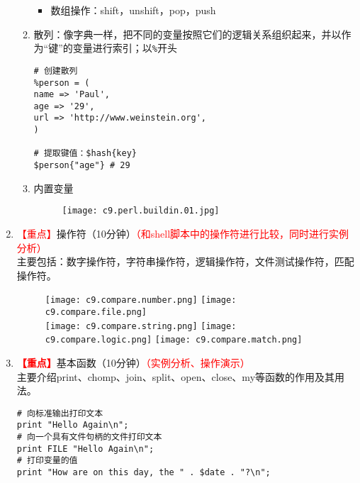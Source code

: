 \documentclass{TIJMUjiaoanLL}
\begin{document}
\begin{enumerate}
\begin{enumerate}
\begin{itemize}
	  \item 数组操作：shift，unshift，pop，push
	\end{itemize}


\otherTail
\newpage
\otherHeader


      \item 散列：像字典一样，把不同的变量按照它们的逻辑关系组织起来，并以作为“键”的变量进行索引；以\verb|%|开头
\begin{verbatim}
# 创建散列
%person = (
name => 'Paul',
age => '29',
url => 'http://www.weinstein.org',
)

# 提取键值：$hash{key}
$person{"age"} # 29
\end{verbatim}
      \item 内置变量
    \vspace*{-10pt}
    \begin{figure}[h]
      \centering
      \texttt{[image: c9.perl.buildin.01.jpg]}
    \end{figure}
    \vspace*{-10pt}

    \end{enumerate}

  \item \textcolor{red}{【重点】}操作符（10分钟）\textcolor{red}{（和shell脚本中的操作符进行比较，同时进行实例分析）}
    \\ 主要包括：数字操作符，字符串操作符，逻辑操作符，文件测试操作符，匹配操作符。
    \vspace*{-10pt}
    \begin{figure}[h]
      \centering
      \texttt{[image: c9.compare.number.png]}
      \quad
      \texttt{[image: c9.compare.file.png]}\\
      \texttt{[image: c9.compare.string.png]}
      \quad
      \texttt{[image: c9.compare.logic.png]}
      \quad
      \texttt{[image: c9.compare.match.png]}
    \end{figure}
    \vspace*{-10pt}


\otherTail
\newpage
\otherHeader


\item \textcolor{red}{\textbf{【重点】}}基本函数（10分钟）\textcolor{red}{（实例分析、操作演示）}
  \\ 主要介绍print、chomp、join、split、open、close、my等函数的作用及其用法。
  \vspace*{-10pt}
\begin{verbatim}
# 向标准输出打印文本
print "Hello Again\n";
# 向一个具有文件句柄的文件打印文本
print FILE "Hello Again\n";
# 打印变量的值
print "How are on this day, the " . $date . "?\n";


\end{verbatim}
\end{enumerate}
\end{document}
